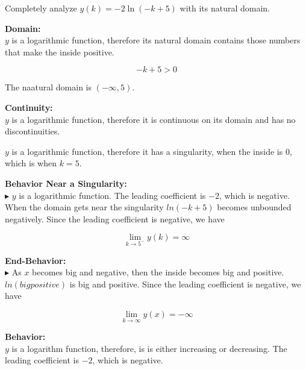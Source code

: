 \documentclass{ximera}
\author{Lee Wayand}
\begin{document}
\begin{exercise}



Completely analyze $y(k) = -2 \ln(-k+5)$ with its natural domain.



\textbf{\textcolor{blue!55!black}{Domain:}}  \\

$y$ is a logarithmic function, therefore its natural domain contains those numbers that make the inside positive. 

\[
-k + 5 > 0
\]

The naatural domain is $(-\infty, 5)$.




\textbf{\textcolor{blue!55!black}{Continuity:}}  \\

$y$ is a logarithmic function, therefore it is continuous on its domain and has no discontinuities.


$y$ is a logarithmic function, therefore it has a singularity, when the inside is $0$, which is when $k = 5$.




\textbf{\textcolor{blue!55!black}{Behavior Near a Singularity:}}  \\



$\blacktriangleright$ $y$ is a logarithmic function. The leading coefficient is $-2$, which is negative.  When the domain gets near the singularity $ln(-k+5)$ becomes unbounded negatively.  Since the leading coefficient is negative, we have

\[
\lim\limits_{k \to 5^-} y(k) = \infty
\]





\textbf{\textcolor{blue!55!black}{End-Behavior:}}  \\


$\blacktriangleright$ As $x$ becomes big and negative, then the inside becomes big and positive.  $ln(big positive)$  is big and positive.  Since the leading coefficient is negative, we have

\[
\lim\limits_{k \to \infty} y(x) = -\infty
\]








\textbf{\textcolor{blue!55!black}{Behavior:}}  \\

$y$ is a logarithm function, therefore, is is either increasing or decreasing.  The leading coefficient is $-2$, which is negative.  



\end{exercise}
\end{document}
